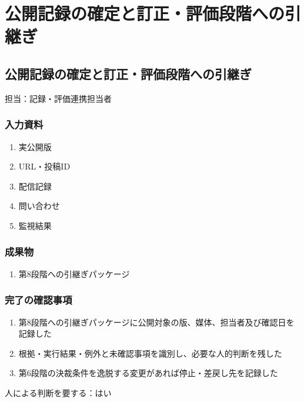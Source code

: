 \documentclass[a4paper,11pt]{article}
\begin{document}
\section{公開記録の確定と訂正・評価段階への引継ぎ}
\subsection{公開記録の確定と訂正・評価段階への引継ぎ}
\par 担当：記録・評価連携担当者\par\medskip
\subsubsection*{入力資料}
\begin{enumerate}[leftmargin=2em,itemsep=0.35em]
\item 実公開版
\item URL・投稿ID
\item 配信記録
\item 問い合わせ
\item 監視結果
\end{enumerate}
\subsubsection*{成果物}
\begin{enumerate}[leftmargin=2em,itemsep=0.35em]
\item 第8段階への引継ぎパッケージ
\end{enumerate}
\subsubsection*{完了の確認事項}
\begin{enumerate}[leftmargin=2em,itemsep=0.35em]
\item 第8段階への引継ぎパッケージに公開対象の版、媒体、担当者及び確認日を記録した
\item 根拠・実行結果・例外と未確認事項を識別し、必要な人的判断を残した
\item 第6段階の決裁条件を逸脱する変更があれば停止・差戻し先を記録した
\end{enumerate}
\par 人による判断を要する：はい\par\medskip
\end{document}
